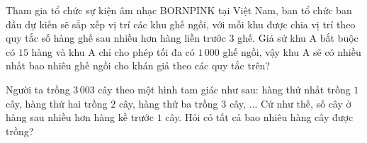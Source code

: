 \begin{ex}%
	Tham gia tổ chức sự kiện âm nhạc BORNPINK tại Việt Nam, ban tổ chức ban đầu dự kiến sẽ sắp xếp vị trí các khu ghế ngồi, với mỗi khu được chia vị trí theo quy tắc số hàng ghế sau nhiều hơn hàng liền trước $3$ ghế. Giả sử khu A bắt buộc có $15$ hàng và khu A chỉ cho phép tối đa có  $1\,000$ ghế ngồi, vậy khu A sẽ có nhiều nhất bao nhiêu ghế ngồi cho khán giả theo các quy tắc trên?
\end{ex}

\begin{ex}%
	Người ta trồng  $3\,003$ cây theo một hình tam giác như sau: hàng thứ nhất trồng $1$ cây, hàng thứ hai trồng $2$ cây, hàng thứ ba trồng $3$ cây, $\ldots$ Cứ như thế, số cây ở hàng sau nhiều hơn hàng kề trước $1$ cây. Hỏi có tất cả bao nhiêu hàng cây được trồng?
\end{ex}

